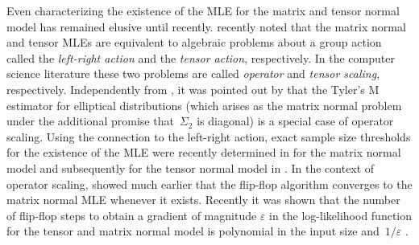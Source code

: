 \documentclass[aos]{imsart}
\theoremstyle{definition}
\numberwithin{equation}{section}
\newcommand{\eps}{\varepsilon}
\newcommand{\CF}[1]{{\color{purple}[CF: #1]}}
\begin{document}
Even characterizing the existence of the MLE for the matrix and tensor normal model has remained elusive until recently.
\cite{amendola2020invariant} recently noted that the matrix normal and tensor MLEs are equivalent to algebraic problems about a group action called the \emph{left-right action} and the \emph{tensor action}, respectively.
In the computer science literature these two problems are called \emph{operator} and \emph{tensor scaling}, respectively.
Independently from \cite{amendola2020invariant}, it was pointed out by \cite{FM20} that the Tyler's M estimator for elliptical distributions (which arises as the matrix normal problem under the additional promise that~$\Sigma_2$ is diagonal) is a special case of operator scaling.
Using the connection to the left-right action, exact sample size thresholds for the existence of the MLE were recently determined in \cite{derksen2020matrix} for the matrix normal model and subsequently for the tensor normal model in \cite{derksen2020tensor}.
In the context of operator scaling, \cite{gurvits2004classical} showed much earlier that the flip-flop algorithm converges to the matrix normal MLE whenever it exists.
Recently it was shown that the number of flip-flop steps to obtain a gradient of magnitude $\eps$ in the log-likelihood function for the tensor and matrix normal model is polynomial in the input size and~$1/\eps$ \citep{GGOW19,burgisser2017alternating,burgisser2019towards}.


\end{document}
